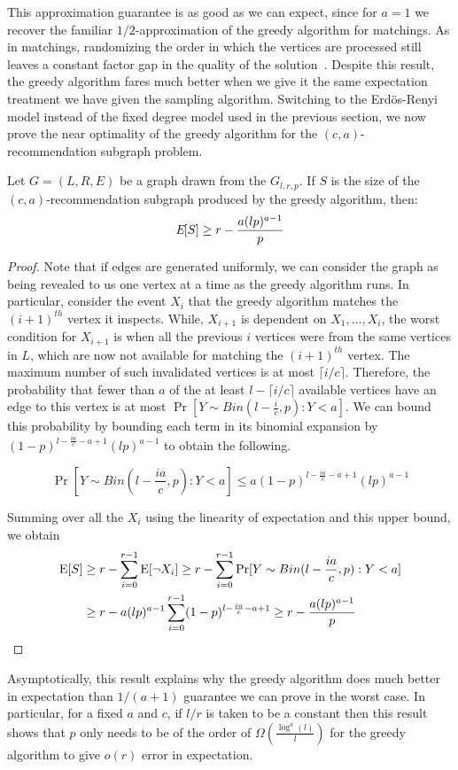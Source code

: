 This approximation guarantee is as good as we can expect, since for $a=1$ we recover the familiar
$1/2$-approximation of the greedy algorithm for matchings.
As in matchings, randomizing the order in
which the vertices are processed still leaves a constant factor gap
in the quality of the solution~\cite{KarpVaziraniVazirani1990}.
Despite this result, the greedy algorithm fares much better when we
give it the same expectation treatment we have given the sampling
algorithm. Switching to the Erd\"{o}s-Renyi model instead of the
fixed degree model used in the previous section, we now prove the
near optimality of the greedy algorithm for the $(c, a)$-recommendation
subgraph problem.

{
\renewcommand{\qedsymbol}{}
\begin{thm}
Let $G=(L,R,E)$ be a graph drawn from the $G_{l,r,p}$. If $S$ is the size of the $(c,a)$-recommendation subgraph produced by the greedy algorithm, then:
\[ \emph{\text{E}}[S] \geq r - \frac{a(lp)^{a-1}}{p}\]
\end{thm}
\begin{proof}
Note that if edges are generated uniformly, we can consider the
graph as being revealed to us one vertex at a time as the greedy
algorithm runs. In particular, consider the event $X_i$ that the
greedy algorithm matches the $(i+1)^{th}$ vertex it inspects. While,
$X_{i+1}$ is dependent on $X_1,\ldots, X_i$, the worst condition for
$X_{i+1}$ is when all the previous $i$ vertices were from the same
vertices in $L$, which are now not available for matching the
$(i+1)^{th}$ vertex. The maximum number of such invalidated vertices
is at most $\lceil i/c \rceil$. Therefore, the probability that fewer
than $a$ of the at least $l-\lceil i/c \rceil $ available
vertices have an edge to this vertex is at most $\Pr[Y\sim Bin(l-\frac{i}{c},p): Y < a]$.
We can bound this probability by bounding each term in its binomial
expansion by $(1-p)^{l-\frac{ia}{c}-a+1}(lp)^{a-1}$ to obtain the following.

\[ \Pr[Y\sim Bin(l-\frac{ia}{c},p): Y < a] \leq a (1-p)^{l-\frac{ia}{c}-a+1}(lp)^{a-1}\]

Summing over all the $X_i$ using the linearity of expectation and this upper bound,
we obtain
\begin{align*}
      \text{E}[S]
&\geq r - \sum_{i=0}^{r-1} \text{E}[\lnot X_i] \geq r - \sum_{i=0}^{r-1} \Pr[Y \sim Bin(l-\frac{ia}{c},p): Y < a] \\
&\geq r - a(lp)^{a-1}\sum_{i=0}^{r-1}(1-p)^{l-\frac{ia}{c}-a+1} \geq r - \frac{a(lp)^{a-1}}{p}
\end{align*}
\end{proof}
}

Asymptotically, this result explains why the greedy
algorithm does much better in expectation than $1/(a+1)$ guarantee we
can prove in the worst case. In particular, for a fixed $a$ and $c$, if
$l/r$ is taken to be a constant then this result shows that $p$ only
needs to be of the order of $\Omega(\frac{\log^{a}(l)}{l})$ for the greedy algorithm to
give $o(r)$ error in expectation.
